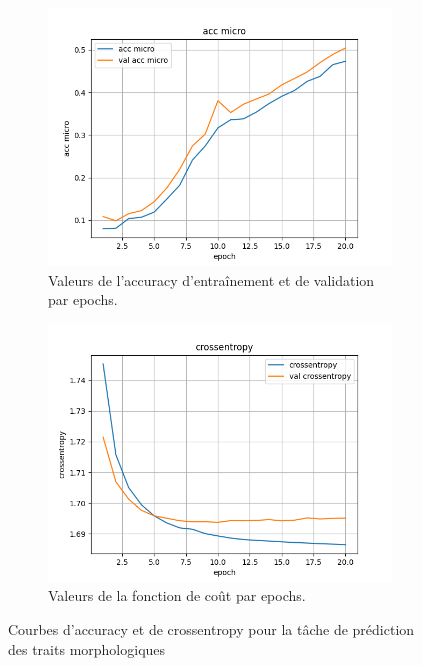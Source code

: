 \documentclass[a4paper]{article}
\begin{document}
\begin{figure}[H]
    \centering
    \begin{subfigure}{0.45\textwidth}
        \centering
        \includegraphics[width=\linewidth]{../logs/get_morphy_separate_French_0/acc micro.png}
        \caption{Valeurs de l'accuracy d'entraînement et de validation par epochs.}
    \end{subfigure}
    \hfill
    \begin{subfigure}{0.45\textwidth}
        \centering
        \includegraphics[width=\linewidth]{../logs/get_morphy_separate_French_0/crossentropy.png}
        \caption{Valeurs de la fonction de coût par epochs.}
    \end{subfigure}
    \caption{Courbes d'accuracy et de crossentropy pour la tâche de prédiction des traits morphologiques}
\end{figure}
\end{document}
